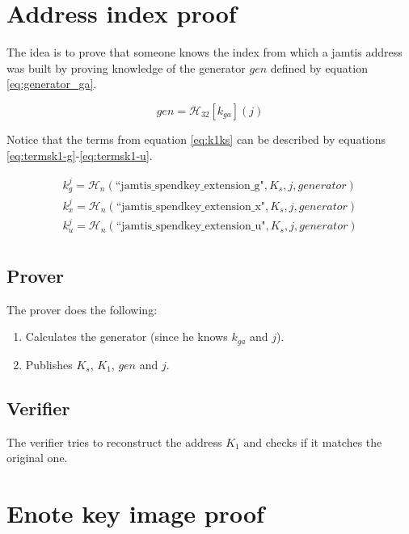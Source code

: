 \documentclass[usletter,11pt,english,oneside,onecolumn,final,openany]{report}
\begin{document}
\section{Address index proof}

The idea is to prove that someone knows the index from which a jamtis address was built by proving knowledge of the generator $gen$ defined by equation \ref{eq:generator_ga}.

\begin{equation}
    gen = \mathcal{H}_{32}[k_{ga}](j)
    \label{eq:generator_ga}
\end{equation}

Notice that the terms from equation \ref{eq:k1ks} can be described by equations \ref{eq:termsk1-g}-\ref{eq:termsk1-u}.

\begin{align}
k^j_g = \mathcal{H}_n(\text{``jamtis\_spendkey\_extension\_g"}, K_s, j, generator) \\
    \label{eq:termsk1-g}
k^j_x = \mathcal{H}_n(\text{``jamtis\_spendkey\_extension\_x"}, K_s, j, generator) \\
    \label{eq:termsk1-x}
k^j_u = \mathcal{H}_n(\text{``jamtis\_spendkey\_extension\_u"}, K_s, j, generator) \\
    \label{eq:termsk1-u}
\end{align}


\subsection{Prover}

The prover does the following:

\begin{enumerate}
    \item Calculates the generator (since he knows $k_{ga}$ and $j$).
    \item Publishes $K_s$, $K_1$, $gen$ and $j$.
\end{enumerate}
	
\subsection{Verifier}

The verifier tries to reconstruct the address $K_1$ and checks if it matches the original one.


\section{Enote key image proof}
\end{document}
